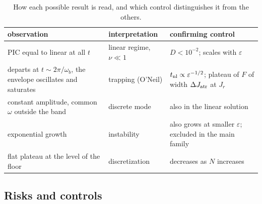 \documentclass[11pt,a4paper]{article}
\begin{document}
\begin{table}[!htbp]
\centering
\small
\begin{tabular}{L{4.4cm}L{3.6cm}L{5.0cm}}
\toprule
observation & interpretation & confirming control\\
\midrule
PIC equal to linear at all $t$ & linear regime, $\nu\ll1$ & $D<10^{-2}$; scales with $\varepsilon$\\
departs at $t\sim2\pi/\omega_b$, the envelope oscillates and saturates & trapping (O'Neil) & $t_{\rm nl}\propto\varepsilon^{-1/2}$; plateau of $F$ of width $\Delta J_{\rm atr}$ at $J_r$\\
constant amplitude, common $\omega$ outside the band & discrete mode & also in the linear solution\\
exponential growth & instability & also grows at smaller $\varepsilon$; excluded in the main family\\
flat plateau at the level of the floor & discretization & decreases as $N$ increases\\
\bottomrule
\end{tabular}
\caption{How each possible result is read, and which control distinguishes it from the
others.}
\label{tab:lectura}
\end{table}

\subsection{Risks and controls}
\label{sec:riesgos}
\end{document}
